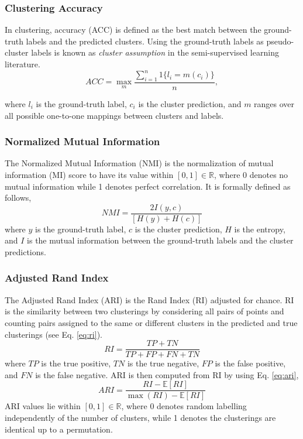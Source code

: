 \documentclass[conference]{IEEEtran}
\begin{document}
\subsubsection{Clustering Accuracy}
In clustering, accuracy (ACC) is defined as the best match between the ground-truth labels and the predicted clusters\cite{yang2010image}. Using the ground-truth labels as pseudo-cluster labels is known as \textit{cluster assumption} in the semi-supervised learning literature\cite{chapelle2009semisupervised}.
\begin{equation}
    ACC = \max_{m} \dfrac{\sum\limits_{i=1}^{n}1\{l_{i}=m\left(c_{i}\right)\}}{n},
\end{equation}

where $l_{i}$ is the ground-truth label, $c_{i}$ is the cluster prediction, and $m$ ranges over all possible one-to-one mappings between clusters and labels.

\subsubsection{Normalized Mutual Information}
The Normalized Mutual Information (NMI) is the normalization of mutual information (MI) score to have its value within $[0, 1]\in\mathbb{R}$, where 0 denotes no mutual information while 1 denotes perfect correlation. It is formally defined as follows,
\begin{equation}
    NMI = \dfrac{2I(y, c)}{[H(y) + H(c)]}
\end{equation}
where $y$ is the ground-truth label, $c$ is the cluster prediction, $H$ is the entropy, and $I$ is the mutual information between the ground-truth labels and the cluster predictions.

\subsubsection{Adjusted Rand Index}
The Adjusted Rand Index (ARI)\cite{hubert1985comparing} is the Rand Index (RI) adjusted for chance. RI is the similarity between two clusterings by considering all pairs of points and counting pairs assigned to the same or different clusters in the predicted and true clusterings (see Eq. \ref{eq:ri}). 
\begin{equation}\label{eq:ri}
    RI = \dfrac{TP + TN}{TP + FP + FN + TN}
\end{equation}
where $TP$ is the true positive, $TN$ is the true negative, $FP$ is the false positive, and $FN$ is the false negative. ARI is then computed from RI by using Eq. \ref{eq:ari},
\begin{equation}\label{eq:ari}
    ARI = \dfrac{RI - \mathbb{E}[RI]}{\max(RI) - \mathbb{E}[RI]}
\end{equation}
ARI values lie within $[0, 1]\in\mathbb{R}$, where 0 denotes random labelling independently of the number of clusters, while 1 denotes the clusterings are identical up to a permutation.
\end{document}
